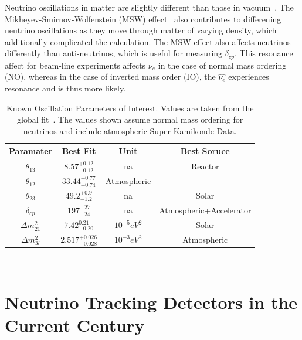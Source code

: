 Neutrino oscillations in matter are slightly different than those in vacuum~\citep{PhysRevD.17.2369}.
The Mikheyev-Smirnov-Wolfenstein (MSW) effect~\citep{Smirnov2004TheME} also contributes to differening neutrino oscillations as they move through matter of varying density, which additionally complicated the calculation.
The MSW effect also affects neutrinos differently than anti-neutrinos, which is useful for measuring $\delta_{cp}$.
This resonance affect for beam-line experiments affects $\nu_{e}$ in the case of normal mass ordering (NO), whereas in the case of inverted mass order (IO), the $\hat{\nu_{e}}$ experiences resonance and is thus more likely.

\begin{table}
\begin{center}
\begin{tabular}{||c c c c||}
 \hline
 Paramater & Best Fit & Unit & Best Soruce\\ [0.5ex]
 \hline\hline
  $\theta_{13}$ & $8.57^{+0.12}_{-0.12}$ & na & Reactor \\ %
 \hline
  $\theta_{12}$ & $33.44^{+0.77}_{-0.74}$ & Atmospheric \\ %
 \hline
  $\theta_{23}$ & $49.2^{+0.9}_{-1.2}$ & na & Solar \\ %
 \hline
  $\delta_{cp}$ & $197^{+27}_{-24}$ & na & Atmospheric+Accelerator \\ %
 \hline
  $\Delta m_{21}^{2}$ & $7.42^{0.21}_{-0.20}$ & $10^{-5}eV^{2}$ & Solar \\ %
 \hline
  $\Delta m_{3l}^{2}$ & $2.517^{+0.026}_{-0.028}$ & $10^{-3}eV^{2}$ & Atmospheric  \\
 \hline
\end{tabular}
\caption{Known Oscillation Parameters of Interest. Values are taken from the global fit~\citep{2020JHEP...09..178E}. The values shown assume normal mass ordering for neutrinos and include atmospheric Super-Kamikonde Data.}
\end{center}
\end{table}
~\label{table:pmns_params}


\section{Neutrino Tracking Detectors in the Current Century}

